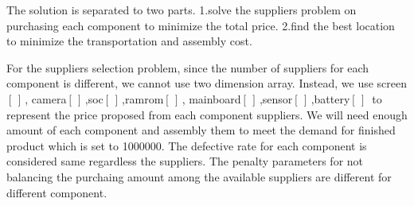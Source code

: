 \documentclass[11pt]{article}
\begin{document}
The solution is separated to two parts. 1.solve the suppliers problem on
purchasing each component to minimize the total price. 2.find the best
location to minimize the transportation and assembly cost.

    For the suppliers selection problem, since the number of suppliers for
each component is different, we cannot use two dimension array. Instead,
we use screen\([ \, ] \,\),
camera\([ \, ] \,\),soc\([ \, ] \,\),ramrom\([ \, ] \,\),
mainboard\([ \, ] \,\),sensor\([ \, ] \,\),battery\([ \, ] \,\) to
represent the price proposed from each component suppliers. We will need
enough amount of each component and assembly them to meet the demand for
finished product which is set to 1000000. The defective rate for each
component is considered same regardless the suppliers. The penalty
parameters for not balancing the purchaing amount among the available
suppliers are different for different component.
\end{document}
